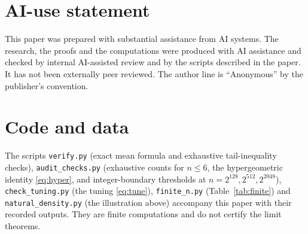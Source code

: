 \documentclass[11pt]{article}
\theoremstyle{remark}
\begin{document}
\section*{AI-use statement}
This paper was prepared with substantial assistance from AI systems. The research, the proofs and the computations were produced with AI assistance and checked by internal AI-assisted review and by the scripts described in the paper. It has not been externally peer reviewed. The author line is ``Anonymous'' by the publisher's convention.

\section*{Code and data}
The scripts \texttt{verify.py} (exact mean formula and exhaustive tail-inequality checks), \texttt{audit\_checks.py} (exhaustive counts for $n\le6$, the hypergeometric identity \eqref{eq:hyper}, and integer-boundary thresholds at $n=2^{128},2^{512},2^{2048}$), \texttt{check\_tuning.py} (the tuning \eqref{eq:tune}), \texttt{finite\_n.py} (Table~\ref{tab:finite}) and \texttt{natural\_density.py} (the illustration above) accompany this paper with their recorded outputs. They are finite computations and do not certify the limit theorems.
\end{document}
